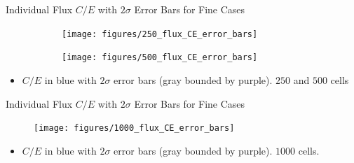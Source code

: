 \documentclass[9pt,t]{beamer}
\begin{document}
\begin{frame}{Individual Flux $C/E$ with $2\sigma$ Error Bars for Fine Cases}
    \begin{figure}[T]
        \hspace*{-1.1cm}
        \begin{subfigure}{0.495\textwidth}
            \texttt{[image: figures/250\_flux\_CE\_error\_bars]}
        \end{subfigure}\hspace*{0.89cm}
        \begin{subfigure}{0.495\textwidth}
            \texttt{[image: figures/500\_flux\_CE\_error\_bars]}
        \end{subfigure}
    \end{figure}
    \begin{itemize}
        \item $C/E$ in blue with $2\sigma$ error bars (gray bounded by purple). $250$ and $500$ cells
    \end{itemize}
\end{frame}

\begin{frame}{Individual Flux $C/E$ with $2\sigma$ Error Bars for Fine Cases}
    \begin{figure}[T]
        \centering
        \texttt{[image: figures/1000\_flux\_CE\_error\_bars]}
    \end{figure}
    \begin{itemize}
        \item $C/E$ in blue with $2\sigma$ error bars (gray bounded by purple). $1000$ cells.
    \end{itemize}
\end{frame}

\end{document}
